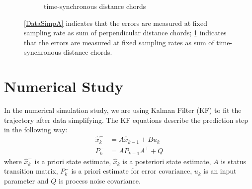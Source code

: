 \begin{figure}[h]
\begin{subfigure}[b]{0.5\textwidth}
{
	}
	\caption{time-synchronous distance chords}\label{DataSimpB}
    \end{subfigure}
\caption{\ref{DataSimpA} indicates that the errors are measured at fixed sampling rate as sum of perpendicular distance chords; \ref{DataSimpB} indicates that the errors are measured at fixed sampling rates as sum of time-synchronous distance chords. \cite{meratnia2004spatiotemporal}}\label{DataSimpAB}
\end{figure}


\section{Numerical Study}

In the numerical simulation study, we are using Kalman Filter (KF) to fit the trajectory after data simplifying. The KF equations describe the prediction step in the following way: 
\begin{align*}
\hat{x}_k^-&=A\hat{x}_{k-1}+Bu_k \\
P_k^-&=AP_{k-1}A^\top+Q
\end{align*}
where $\hat{x}_k^-$ is a priori state estimate, $\hat{x}_k$ is a posteriori state estimate, $A$ is status transition matrix, $P_k^-$ is a priori estimate for error covariance, $u_k$ is an input parameter and $Q$ is process noise covariance. 

